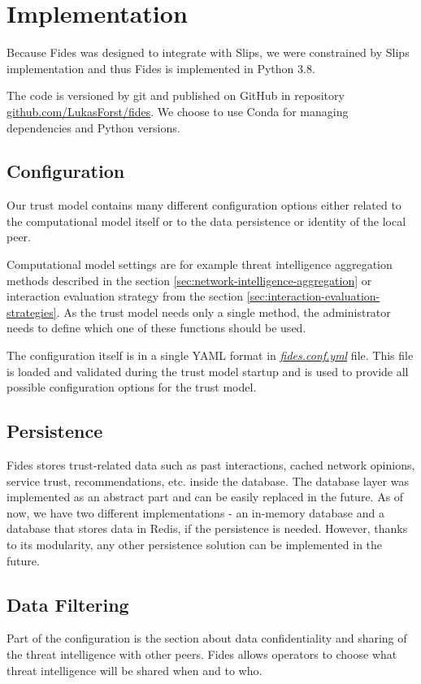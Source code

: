 \section{Implementation}
\label{sec:implementation}
Because Fides was designed to integrate with Slips, we were constrained by Slips implementation and thus Fides is implemented in Python 3.8.

The code is versioned by git and published on GitHub in repository \href{https://github.com/LukasForst/fides}{github.com/LukasForst/fides}.
We choose to use Conda \cite{conda} for managing dependencies and Python versions.

\subsection{Configuration}
\label{subsec:configuration}
Our trust model contains many different configuration options either related to the computational model itself or to the data persistence or identity of the local peer.

Computational model settings are for example threat intelligence aggregation methods described in the section \ref{sec:network-intelligence-aggregation} or interaction evaluation strategy from the section \ref{sec:interaction-evaluation-strategies}.
As the trust model needs only a single method, the administrator needs to define which one of these functions should be used.

The configuration itself is in a single YAML \cite{yaml} format in \href{https://github.com/LukasForst/fides/blob/master/fides.conf.yml}{\textit{fides.conf.yml}} file.
This file is loaded and validated during the trust model startup and is used to provide all possible configuration options for the trust model.

\subsection{Persistence}
\label{subsec:persistence}
Fides stores trust-related data such as past interactions, cached network opinions, service trust, recommendations, etc. inside the database.
The database layer was implemented as an abstract part and can be easily replaced in the future.
As of now, we have two different implementations - an in-memory database and a database that stores data in Redis, if the persistence is needed.
However, thanks to its modularity, any other persistence solution can be implemented in the future.

\subsection{Data Filtering}
\label{subsec:data-filtering}
Part of the configuration is the section about data confidentiality and sharing of the threat intelligence with other peers.
Fides allows operators to choose what threat intelligence will be shared when and to who.

